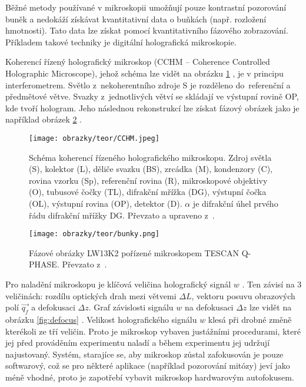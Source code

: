 \documentclass[12pt, a4paper, twoside]{article}
\begin{document}
Běžné metody používané v mikroskopii umožňují pouze kontrastní pozorování buněk a nedokáží
získávat kvantitativní data o buňkách (např. rozložení hmotnosti). Tato data lze získat
pomocí kvantitativního fázového zobrazování. Příkladem takové techniky je digitální holografická mi\-kro\-sko\-pi\-e.

Koherencí řízený holografický mikroskop (CCHM -- Coherence Controlled Holographic Mi\-cro\-scope), jehož schéma lze vidět na obrázku \ref{fig:CCHM_schema} \cite{CCHM}, je v principu interferometrem. Světlo z~ne\-ko\-he\-rent\-ní\-ho zdroje S je rozděleno do~referenční a předmětové větve. Svazky z~jednotlivých větví se skládají ve výstupní rovině OP, kde tvoří hologram. Jeho následnou rekonstrukcí lze získat fázový obrázek jako je například obrázek \ref{fig:bunky} \cite{bunky2016}.

\begin{figure}
  \centering
  \texttt{[image: obrazky/teor/CCHM.jpeg]}
  \caption{Schéma koherencí řízeného holografického mikroskopu. Zdroj světla (S),
  kolektor (L), děliče svazku (BS), zrcádka (M), kondenzory (C), rovina vzorku (Sp), referenční
  rovina (R), mikroskopové objektivy (O), tubusové čočky (TL), difrakční mřížka (DG),
  výstupní čočka (OL), výstupní rovina (OP), detektor (D). $\alpha$ je difrakční úhel prvého řádu difrakční mřížky DG. Převzato a upraveno z~\cite{CCHM}. }
  \label{fig:CCHM_schema}
\end{figure}

\begin{figure}[h!]
  \texttt{[image: obrazky/teor/bunky.png]}
  \caption[Fázový obrázek buněk.]{Fázové obrázky LW13K2 pořízené mikroskopem TESCAN Q-PHASE. Převzato z~\cite{bunky2016}.}
  \label{fig:bunky}
\end{figure}

Pro naladění mikroskopu je klíčová veličina holografický signál $w$ \cite{zbynek_disertace}. Ten závisí na 3 veličinách: rozdílu optických drah mezi větvemi $\Delta L$, vektoru posuvu obrazových polí $\vec{q_f}$ a defokusaci $\Delta z$. Graf závislosti signálu $w$ na defokusaci $\Delta z$ lze vidět na obrázku \ref{fig:defocus} \cite{zbynek_disertace}. Velikost ho\-lo\-gra\-fi\-cké\-ho signálu $w$ klesá při drobné změně kterékoli ze tří veličin. Proto je mikroskop vybaven justážními procedurami, které jej před prováděním experimentu naladí a během experimentu jej udržují najustovaný. Systém, starajíce se, aby mikroskop zůstal zafokusován je pouze softwarový, což se pro některé aplikace (například pozorování mitózy) jeví jako méně vhodné, proto je zapotřebí vybavit mikroskop hardwarovým autofokusem.
\end{document}
